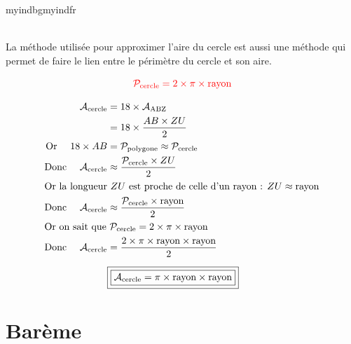 \documentclass{exam}
\begin{document}
\begin{Indication}{myindbg}{myindfr}

   \\

  La méthode utilisée pour approximer l'aire du cercle est aussi une méthode qui permet de faire le lien entre le périmètre du cercle et son aire. 

  \[
  \color{red}\mathcal{P_\text{cercle}} = 2 \times \pi \times \text{rayon}
\]
  
  
 \begin{align*}
\mathcal{A}_{\text{cercle}}
  &= 18 \times \mathcal{A}_{\text{ABZ}} \\
  &= 18 \times \frac{AB \times ZU}{2} \\
\text{Or } \quad 18 \times AB
  &= \mathcal{P}_{\text{polygone}}
  \approx \mathcal{P}_{\text{cercle}} \\
\text{Donc } \quad
  \mathcal{A}_{\text{cercle}}
  &\approx \frac{\mathcal{P}_{\text{cercle}} \times ZU}{2} \\
\intertext{Or la longueur $ZU$ est proche de celle d'un rayon : $ZU \approx \text{rayon}$}
\text{Donc } \quad
  \mathcal{A}_{\text{cercle}}
  &\approx \frac{\mathcal{P}_{\text{cercle}} \times \text{rayon}}{2} \\
\intertext{Or on sait que $\mathcal{P}_{\text{cercle}} = 2 \times \pi \times \text{rayon}$}
\text{Donc } \quad
\mathcal{A}_{\text{cercle}}
  &= \frac{2 \times \pi \times \text{rayon} \times \text{rayon}}{2} \\[6pt]
&\boxed{\boxed{
\mathcal{A}_{\text{cercle}} = \pi \times \text{rayon} \times \text{rayon}
}}
\end{align*}
\end{Indication}

\section{Barème}
\end{document}
